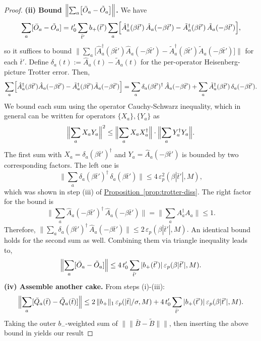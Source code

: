 \begin{proof}
    \noindent\textbf{(ii) Bound $\Bigl\|\sum_a \bigl[\bar{O}_a - \tilde{O}_a\bigr]\Bigr\|$.} We have
    $$
    \sum_a [\bar{O}_a - \tilde{O}_a] = t_0' \sum_{\bar{t}'} b_+(\bar{t}') \sum_a \Bigl[\hat{A}_a^\dagger(\beta\bar{t}')\, \hat{A}_a(-\beta\bar{t}') - \tilde{A}_a^\dagger(\beta\bar{t}')\, \tilde{A}_a(-\beta\bar{t}')\Bigr],
    $$
    so it suffices to bound $\bigl\|\sum_a \bigl[\hat{A}_a^\dagger(\beta\bar{t}')\hat{A}_a(-\beta\bar{t}') - \tilde{A}_a^\dagger(\beta\bar{t}')\tilde{A}_a(-\beta\bar{t}')\bigr]\bigr\|$ for each $\bar{t}'$. Define $\delta_a(t) := \hat{A}_a(t) - \tilde{A}_a(t)$ for the per-operator Heisenberg-picture Trotter error. Then,
    $$
    \sum_a \Bigl[\hat{A}_a^\dagger(\beta\bar{t}')\hat{A}_a(-\beta\bar{t}') - \tilde{A}_a^\dagger(\beta\bar{t}')\tilde{A}_a(-\beta\bar{t}')\Bigr]
    = \sum_a \delta_a(\beta\bar{t}')^\dagger\, \hat{A}_a(-\beta\bar{t}') + \sum_a \tilde{A}_a^\dagger(\beta\bar{t}')\, \delta_a(-\beta\bar{t}').
    $$
    We bound each sum using the operator Cauchy-Schwarz inequality, which in general can be written for operators $\{X_a\}, \{Y_a\}$ as
    $$
    \Bigl\|\sum_a X_a Y_a\Bigr\|^2 \leq \Bigl\|\sum_a X_a X_a^\dagger\Bigr\| \cdot \Bigl\|\sum_a Y_a^\dagger Y_a\Bigr\|.
    $$
    The first sum with $X_a = \delta_a(\beta\bar{t}')^\dagger$ and $Y_a = \hat{A}_a(-\beta\bar{t}')$ is bounded by two corresponding factors. The left one is
    $$
    \bigl\|\sum_a \delta_a(\beta\bar{t}')^\dagger\, \delta_a(\beta\bar{t}')\bigr\| \leq 4\,\varepsilon_p^2(\beta|\bar{t}'|, M),
    $$
    which was shown in step (iii) of \hyperref[prop:trotter-diss]{Proposition~\ref*{prop:trotter-diss}}. The right factor for the bound is 
    $$
    \bigl\|\sum_a \hat{A}_a(-\beta\bar{t}')^\dagger\, \hat{A}_a(-\beta\bar{t}')\bigr\| = \bigl\|\sum_a A_a^\dagger A_a\bigr\| \leq 1.
    $$
    Therefore, $\bigl\|\sum_a \delta_a(\beta\bar{t}')^\dagger\, \hat{A}_a(-\beta\bar{t}')\bigr\| \leq 2\,\varepsilon_p(\beta|\bar{t}'|, M).$ An identical bound holds for the second sum as well. Combining them via triangle inequality leads to,
    $$
    \Bigl\|\sum_a [\bar{O}_a - \tilde{O}_a]\Bigr\|
    \leq 4\, t_0' \sum_{\bar{t}'} |b_+(\bar{t}')|\, \varepsilon_p(\beta|\bar{t}'|, M).
    $$
    \noindent\textbf{(iv) Assemble another cake.} From steps (i)-(iii):
    $$
    \Bigl\|\sum_a [\bar{Q}_a(\bar{t}) - \tilde{Q}_a(\bar{t})]\Bigr\|
    \leq 2\,\|b_+\|_1\, \varepsilon_p(|\bar{t}|/\sigma, M)
    + 4\, t_0' \sum_{\bar{t}'} |b_+(\bar{t}')|\, \varepsilon_p(\beta|\bar{t}'|, M).
    $$
    Taking the outer $b_-$-weighted sum of $\|\|\bar{B} - \tilde{B}\|\|$, then inserting the above bound in yields our result

\end{proof}
